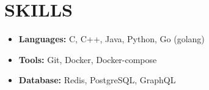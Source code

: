 \documentclass[paper=a4,fontsize=11pt]{scrartcl}
\newcommand{\sepspace}{\vspace*{0.5em}}
\newcommand{\NewPart}[1]{
    \section*{\uppercase{#1}}
}
\begin{document}
\NewPart{Skills}{}
\begin{itemize}
    \item[\faCode]
        \textbf{Languages:} C, C++, Java, Python, Go (golang)
    \item[\faTools]
        \textbf{Tools:} Git, Docker, Docker-compose  
    \item[\faDatabase]
        \textbf{Database:} Redis, PostgreSQL, GraphQL 

\end{itemize}
\sepspace
\end{document}
